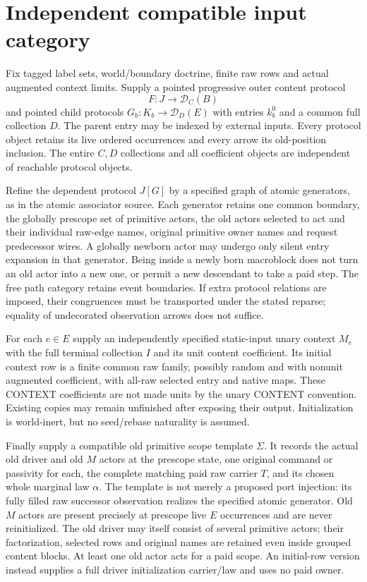 \documentclass[11pt]{article}\usepackage{amsmath,amssymb,amsthm,geometry}\geometry{margin=1in}
\begin{document}
\section{Independent compatible input category}
Fix tagged label sets, world/boundary doctrine, finite raw rows and actual augmented context limits. Supply a pointed progressive outer content protocol
\[
 F:J\longrightarrow\mathcal D_C(B)
\]
and pointed child protocols $G_b:K_b\to\mathcal D_D(E)$ with entries $k_b^0$ and a common full collection $D$. The parent entry may be indexed by external inputs. Every protocol object retains its live ordered occurrences and every arrow its old-position inclusion. The entire $C,D$ collections and all coefficient objects are independent of reachable protocol objects.

Refine the dependent protocol $J[G]$ by a specified graph of atomic generators, as in the atomic associator source. Each generator retains one common boundary, the globally prescope set of primitive actors, the old actors selected to act and their individual raw-edge names, original primitive owner names and request predecessor wires. A globally newborn actor may undergo only silent entry expansion in that generator. Being inside a newly born macroblock does not turn an old actor into a new one, or permit a new descendant to take a paid step. The free path category retains event boundaries. If extra protocol relations are imposed, their congruences must be transported under the stated reparse; equality of undecorated observation arrows does not suffice.

For each $e\in E$ supply an independently specified static-input unary context $M_e$ with the full terminal collection $I$ and its unit content coefficient. Its initial context row is a finite common raw family, possibly random and with nonunit augmented coefficient, with all-raw selected entry and native maps. These CONTEXT coefficients are not made units by the unary CONTENT convention. Existing copies may remain unfinished after exposing their output. Initialization is world-inert, but no seed/rebase naturality is assumed.

Finally supply a compatible old primitive scope template $\Sigma$. It records the actual old driver and old $M$ actors at the prescope state, one original command or passivity for each, the complete matching paid raw carrier $T$, and its chosen whole marginal law $\alpha$. The template is not merely a proposed port injection: its fully filled raw successor observation realizes the specified atomic generator. Old $M$ actors are present precisely at prescope live $E$ occurrences and are never reinitialized. The old driver may itself consist of several primitive actors; their factorization, selected rows and original names are retained even inside grouped content blocks. At least one old actor acts for a paid scope. An initial-row version instead supplies a full driver initialization carrier/law and uses no paid owner.
\end{document}
